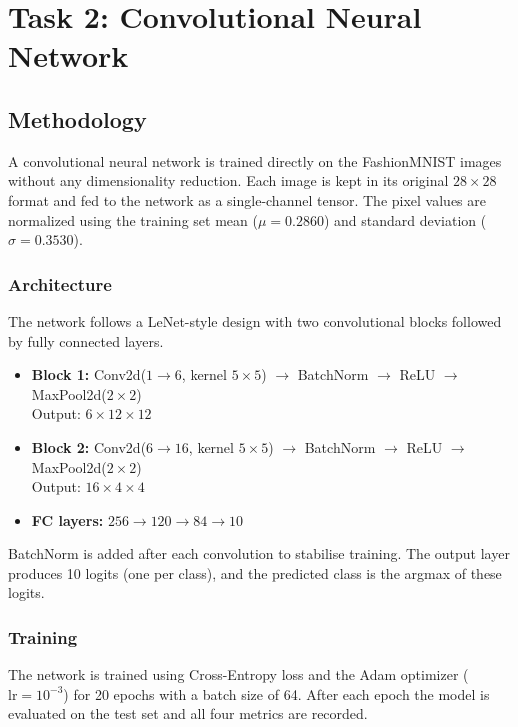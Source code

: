 \documentclass[12pt,a4paper]{article}
\begin{document}
\section{Task 2: Convolutional Neural Network}

\subsection{Methodology}

A convolutional neural network is trained directly on the FashionMNIST images
without any dimensionality reduction. Each image is kept in its original
$28 \times 28$ format and fed to the network as a single-channel tensor.
The pixel values are normalized using the training set mean ($\mu = 0.2860$)
and standard deviation ($\sigma = 0.3530$).

\subsubsection{Architecture}

The network follows a LeNet-style design with two convolutional blocks followed
by fully connected layers.

\begin{itemize}
    \item \textbf{Block 1:} Conv2d($1 \to 6$, kernel $5\times5$) $\to$ BatchNorm $\to$ ReLU $\to$ MaxPool2d($2\times2$) \\
          Output: $6 \times 12 \times 12$
    \item \textbf{Block 2:} Conv2d($6 \to 16$, kernel $5\times5$) $\to$ BatchNorm $\to$ ReLU $\to$ MaxPool2d($2\times2$) \\
          Output: $16 \times 4 \times 4$
    \item \textbf{FC layers:} $256 \to 120 \to 84 \to 10$
\end{itemize}

BatchNorm is added after each convolution to stabilise training. The output
layer produces 10 logits (one per class), and the predicted class is the
argmax of these logits.

\subsubsection{Training}

The network is trained using Cross-Entropy loss and the Adam optimizer
($\text{lr} = 10^{-3}$) for 20 epochs with a batch size of 64.
After each epoch the model is evaluated on the test set and all four
metrics are recorded.
\end{document}
